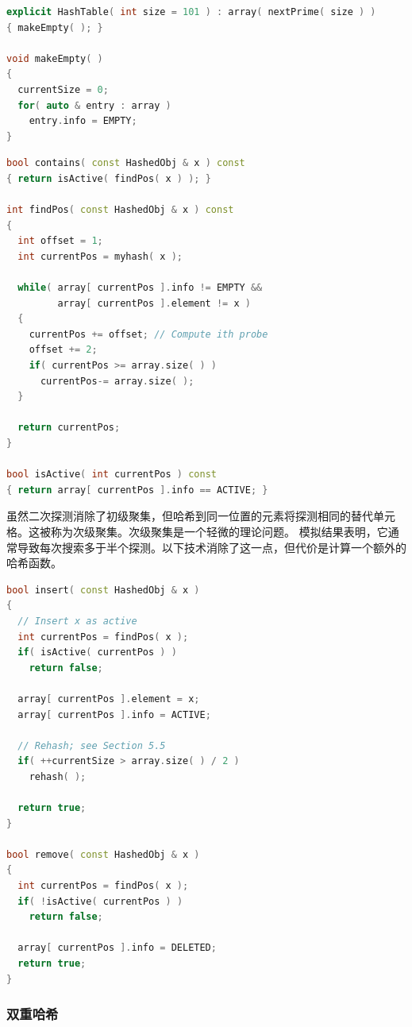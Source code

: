 \documentclass[a4paper]{ctexart}
\theoremstyle{definition}
\theoremstyle{definition}
\begin{document}
\begin{lstlisting}[language=C++]
explicit HashTable( int size = 101 ) : array( nextPrime( size ) )
{ makeEmpty( ); }
  
void makeEmpty( )
{
  currentSize = 0;
  for( auto & entry : array )
    entry.info = EMPTY;
}  
\end{lstlisting}

\begin{lstlisting}[language=C++]
bool contains( const HashedObj & x ) const
{ return isActive( findPos( x ) ); }

int findPos( const HashedObj & x ) const
{
  int offset = 1;
  int currentPos = myhash( x );
  
  while( array[ currentPos ].info != EMPTY &&
         array[ currentPos ].element != x )
  {
    currentPos += offset; // Compute ith probe
    offset += 2;
    if( currentPos >= array.size( ) )
      currentPos-= array.size( );
  }
  
  return currentPos;
}

bool isActive( int currentPos ) const
{ return array[ currentPos ].info == ACTIVE; }  
\end{lstlisting}

虽然二次探测消除了初级聚集，但哈希到同一位置的元素将探测相同的替代单元格。这被称为次级聚集。次级聚集是一个轻微的理论问题。
模拟结果表明，它通常导致每次搜索多于半个探测。以下技术消除了这一点，但代价是计算一个额外的哈希函数。

\begin{lstlisting}[language=C++]
bool insert( const HashedObj & x )
{
  // Insert x as active
  int currentPos = findPos( x );
  if( isActive( currentPos ) )
    return false;
  
  array[ currentPos ].element = x;
  array[ currentPos ].info = ACTIVE;
  
  // Rehash; see Section 5.5
  if( ++currentSize > array.size( ) / 2 )
    rehash( );
  
  return true;
}

bool remove( const HashedObj & x )
{
  int currentPos = findPos( x );
  if( !isActive( currentPos ) )
    return false;
  
  array[ currentPos ].info = DELETED;
  return true;
}
\end{lstlisting}

\subsubsection{双重哈希}
\end{document}
